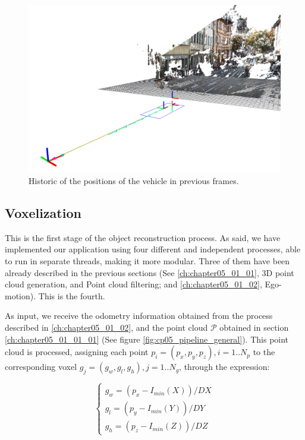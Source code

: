 \begin{figure}[t]
  \centering
  \includegraphics{tfs}
  \caption{Historic of the positions of the vehicle in previous frames.}\label{fig:cp05_tfs}
\end{figure}

\subsection{Voxelization}\label{ch:chapter05_01_03}

This is the first stage of the object reconstruction process. As said, we have implemented our application using four different and independent processes, able to run in separate threads, making it more modular. Three of them have been already described in the previous sections (See \ref{ch:chapter05_01_01}, 3D point cloud generation, and Point cloud filtering; and \ref{ch:chapter05_01_02}, Ego-motion). This is the fourth.

As input, we receive the odometry information obtained from the process described in \ref{ch:chapter05_01_02}, and the point cloud $\mathcal{P}$ obtained in section \ref{ch:chapter05_01_01_01} (See figure \ref{fig:cp05_pipeline_general}). This point cloud is processed, assigning each point $p_i = (p_x, p_y, p_z), i=1..N_p$ to the corresponding voxel $g_j=(g_w, g_l, g_h), j=1..N_g$, through the expression:

\begin{equation}\label{eq:cp05_point_to_voxel}
\begin{cases}
g_w = (p_x - I_{min}(X)) / DX\\
g_l = (p_y - I_{min}(Y)) / DY\\
g_h = (p_z - I_{min}(Z)) / DZ
\end{cases}
\end{equation}

